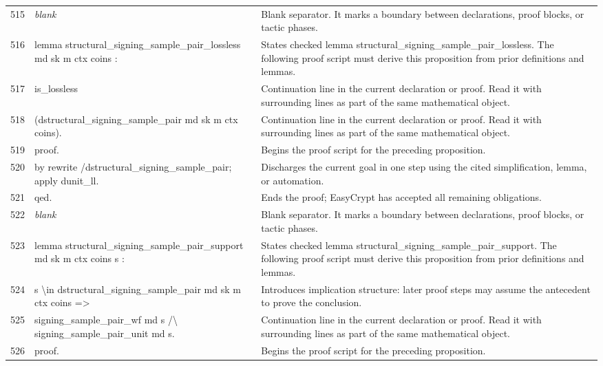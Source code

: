 \documentclass[10pt]{article}
\begin{document}
\begin{longtable}{r L{0.53\textwidth} L{0.37\textwidth}}
515 & {\ttfamily\scriptsize \emph{blank}} & Blank separator.  It marks a boundary between declarations, proof blocks, or tactic phases. \\
516 & {\ttfamily\scriptsize lemma structural\_signing\_sample\_pair\_lossless md sk m ctx coins :} & States checked lemma structural\_signing\_sample\_pair\_lossless.  The following proof script must derive this proposition from prior definitions and lemmas. \\
517 & {\ttfamily\scriptsize   is\_lossless} & Continuation line in the current declaration or proof.  Read it with surrounding lines as part of the same mathematical object. \\
518 & {\ttfamily\scriptsize     (dstructural\_signing\_sample\_pair md sk m ctx coins).} & Continuation line in the current declaration or proof.  Read it with surrounding lines as part of the same mathematical object. \\
519 & {\ttfamily\scriptsize proof.} & Begins the proof script for the preceding proposition. \\
520 & {\ttfamily\scriptsize by rewrite /dstructural\_signing\_sample\_pair; apply dunit\_ll.} & Discharges the current goal in one step using the cited simplification, lemma, or automation. \\
521 & {\ttfamily\scriptsize qed.} & Ends the proof; EasyCrypt has accepted all remaining obligations. \\
522 & {\ttfamily\scriptsize \emph{blank}} & Blank separator.  It marks a boundary between declarations, proof blocks, or tactic phases. \\
523 & {\ttfamily\scriptsize lemma structural\_signing\_sample\_pair\_support md sk m ctx coins s :} & States checked lemma structural\_signing\_sample\_pair\_support.  The following proof script must derive this proposition from prior definitions and lemmas. \\
524 & {\ttfamily\scriptsize   s \textbackslash{}in dstructural\_signing\_sample\_pair md sk m ctx coins =>} & Introduces implication structure: later proof steps may assume the antecedent to prove the conclusion. \\
525 & {\ttfamily\scriptsize   signing\_sample\_pair\_wf md s /\textbackslash{} signing\_sample\_pair\_unit md s.} & Continuation line in the current declaration or proof.  Read it with surrounding lines as part of the same mathematical object. \\
526 & {\ttfamily\scriptsize proof.} & Begins the proof script for the preceding proposition. \\

\end{longtable}
\end{document}
